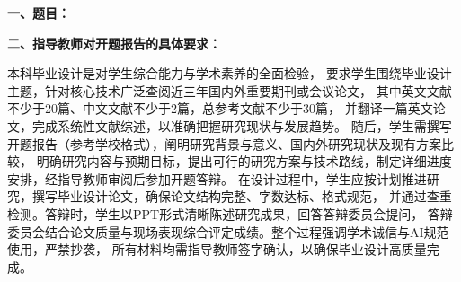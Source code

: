 {
    \setlength{\parindent}{0em}
    \par {\bfseries 一、题目：\uline{\hfill \Title \hfill}}
    \par {\bfseries 二、指导教师对开题报告的具体要求：}
    
}

本科毕业设计是对学生综合能力与学术素养的全面检验，
要求学生围绕毕业设计主题，针对核心技术广泛查阅近三年国内外重要期刊或会议论文，
其中英文文献不少于20篇、中文文献不少于2篇，总参考文献不少于30篇，
并翻译一篇英文论文，完成系统性文献综述，以准确把握研究现状与发展趋势。
随后，学生需撰写开题报告（参考学校格式），阐明研究背景与意义、国内外研究现状及现有方案比较，
明确研究内容与预期目标，提出可行的研究方案与技术路线，制定详细进度安排，经指导教师审阅后参加开题答辩。
在设计过程中，学生应按计划推进研究，撰写毕业设计论文，确保论文结构完整、字数达标、格式规范，
并通过查重检测。答辩时，学生以PPT形式清晰陈述研究成果，回答答辩委员会提问，
答辩委员会结合论文质量与现场表现综合评定成绩。整个过程强调学术诚信与AI规范使用，严禁抄袭，
所有材料均需指导教师签字确认，以确保毕业设计高质量完成。

\mbox{} \vfill

\signature{指导教师（签名）}

